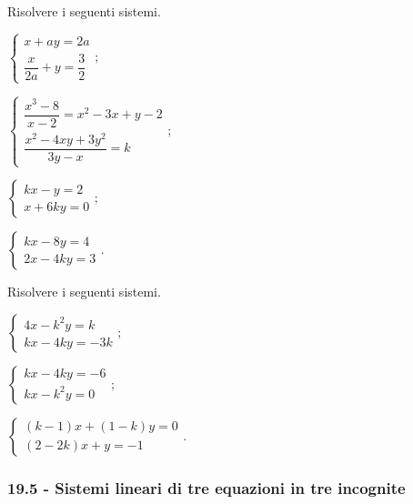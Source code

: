 \begin{esercizio}[\Ast]
 \label{ese:19.57}
Risolvere i seguenti sistemi.
\begin{multicols}{2}
 \begin{enumeratea}
 {\longarray
\item $\left\{\begin{array}{l}x+ay=2a\\\dfrac{x}{2a}+y=\dfrac{3}{2}\end{array}\right.;$
\item $\left\{\begin{array}{l}\dfrac{x^{3}-8}{x-2}=x^{2}-3x+y-2\\\dfrac{x^{2}-4xy+3y^{2}}{3y-x}=k\end{array}\right.;$
\item $\left\{\begin{array}{l}kx-y=2\\x+6ky=0\end{array}\right.;$
\item $\left\{\begin{array}{l}kx-8y=4\\2x-4ky=3\end{array}\right..$}
 \end{enumeratea}
\end{multicols}
\end{esercizio}

\begin{esercizio}[\Ast]
 \label{ese:19.58}
Risolvere i seguenti sistemi.
\begin{multicols}{2}
 \begin{enumeratea}
\item $\left\{\begin{array}{l}4x-k^{2}y=k\\kx-4ky=-3k\end{array}\right.;$
\item $\left\{\begin{array}{l}kx-4ky=-6\\kx-k^{2}y=0\end{array}\right.;$
\item $\left\{\begin{array}{l}(k-1)x+(1-k)y=0\\(2-2k)x+y=-1\end{array}\right..$
 \end{enumeratea}
\end{multicols}
\end{esercizio}

 \subsubsection*{19.5 - Sistemi lineari di tre equazioni in tre incognite}

